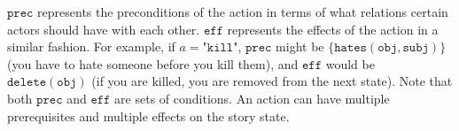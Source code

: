$\texttt{prec}$ represents the preconditions of the action in terms of what 
relations certain actors should have with each other.
$\texttt{eff}$ represents the effects of the action in a similar fashion.
For example, if $a = \texttt{"kill"}$, $\texttt{prec}$ might be 
$ \{\texttt{hates}(\texttt{obj}, \texttt{subj})\} $ (you have to hate someone 
before you kill them), and $\texttt{eff}$ would be ${\texttt{delete}(\texttt{obj})}$
(if you are killed, you are removed from the next state).
Note that both $\texttt{prec}$ and $\texttt{eff}$ are sets of conditions.
An action can have multiple prerequisites and multiple effects on the story state.
